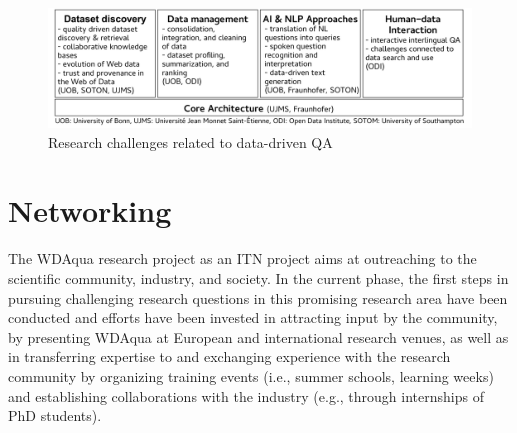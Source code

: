 \documentclass[a4paper]{llncs}
\begin{document}
	\begin{figure}[htpb!]
	    \centering
	    \includegraphics[width=\textwidth]{figure.pdf}
		\caption{Research challenges related to data-driven QA}
		\label{fig:figure}
	\end{figure}

	\section{Networking} \label{sec:networking}
	The WDAqua research project as an ITN project aims at outreaching to the scientific community, industry, and society. In the current phase, the first steps in pursuing challenging research questions in this promising research area have been conducted and efforts have been invested in attracting input by the community, by presenting WDAqua at European and international research venues, as well as in transferring expertise to and exchanging experience with the research community by organizing training events (i.e., summer schools, learning weeks) and establishing collaborations with the industry (e.g., through internships of PhD students).
	
\end{document}
